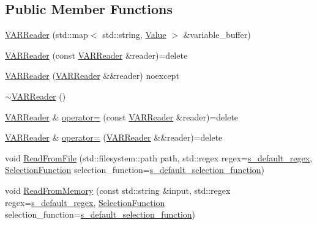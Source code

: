 \subsection*{Public Member Functions}
\begin{DoxyCompactItemize}
\item 
\mbox{\hyperlink{classmage_1_1loader_1_1_v_a_r_reader_a1bc1c64c05bac406be792d9d51739379}{V\+A\+R\+Reader}} (std\+::map$<$ std\+::string, \mbox{\hyperlink{namespacemage_a68ae02d3a746ed2f285aa2b10f131a21}{Value}} $>$ \&variable\+\_\+buffer)
\item 
\mbox{\hyperlink{classmage_1_1loader_1_1_v_a_r_reader_ab4ab4d94c90a2797ae40e54e0dd7c127}{V\+A\+R\+Reader}} (const \mbox{\hyperlink{classmage_1_1loader_1_1_v_a_r_reader}{V\+A\+R\+Reader}} \&reader)=delete
\item 
\mbox{\hyperlink{classmage_1_1loader_1_1_v_a_r_reader_aeefac440730fc89b16afa19695c956d5}{V\+A\+R\+Reader}} (\mbox{\hyperlink{classmage_1_1loader_1_1_v_a_r_reader}{V\+A\+R\+Reader}} \&\&reader) noexcept
\item 
\mbox{\hyperlink{classmage_1_1loader_1_1_v_a_r_reader_acd3bbd51ccc774d2f74a4520b6143990}{$\sim$\+V\+A\+R\+Reader}} ()
\item 
\mbox{\hyperlink{classmage_1_1loader_1_1_v_a_r_reader}{V\+A\+R\+Reader}} \& \mbox{\hyperlink{classmage_1_1loader_1_1_v_a_r_reader_a78d39071ad5103c848782ff82be397bb}{operator=}} (const \mbox{\hyperlink{classmage_1_1loader_1_1_v_a_r_reader}{V\+A\+R\+Reader}} \&reader)=delete
\item 
\mbox{\hyperlink{classmage_1_1loader_1_1_v_a_r_reader}{V\+A\+R\+Reader}} \& \mbox{\hyperlink{classmage_1_1loader_1_1_v_a_r_reader_a0da01229f594cb701b3e20d53be9d16e}{operator=}} (\mbox{\hyperlink{classmage_1_1loader_1_1_v_a_r_reader}{V\+A\+R\+Reader}} \&\&reader)=delete
\item 
void \mbox{\hyperlink{classmage_1_1loader_1_1_v_a_r_reader_aba8857b3d0f49250e312bd737d7d0e9c}{Read\+From\+File}} (std\+::filesystem\+::path path, std\+::regex regex=\mbox{\hyperlink{classmage_1_1_line_reader_a6713da665d123ab39293c0c5a4e8e1de}{s\+\_\+default\+\_\+regex}}, \mbox{\hyperlink{classmage_1_1_line_reader_a17bbae61a3ce30bdb251d6c76e1a4522}{Selection\+Function}} selection\+\_\+function=\mbox{\hyperlink{classmage_1_1_line_reader_a93da10f6f69b44accfec8074712f35de}{s\+\_\+default\+\_\+selection\+\_\+function}})
\item 
void \mbox{\hyperlink{classmage_1_1loader_1_1_v_a_r_reader_a6411d017fe1c7f30a544e2f0176f14a2}{Read\+From\+Memory}} (const std\+::string \&input, std\+::regex regex=\mbox{\hyperlink{classmage_1_1_line_reader_a6713da665d123ab39293c0c5a4e8e1de}{s\+\_\+default\+\_\+regex}}, \mbox{\hyperlink{classmage_1_1_line_reader_a17bbae61a3ce30bdb251d6c76e1a4522}{Selection\+Function}} selection\+\_\+function=\mbox{\hyperlink{classmage_1_1_line_reader_a93da10f6f69b44accfec8074712f35de}{s\+\_\+default\+\_\+selection\+\_\+function}})
\end{DoxyCompactItemize}
